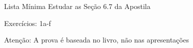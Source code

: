 \begin{frame}{Lista Mínima}
  Estudar as Seção 6.7 da Apostila

  \vspace{\baselineskip}
  Exercícios: 1a-f

  \vfill
  Atenção: A prova é baseada no livro, não nas apresentações
\end{frame}


